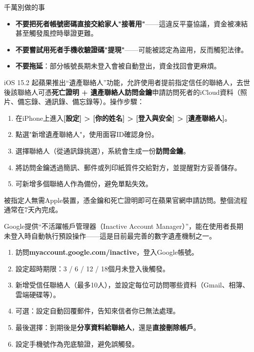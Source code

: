 \begin{tcbwarn}{千萬別做的事}
\begin{itemize}
  \item \textbf{不要把死者帳號密碼直接交給家人"接著用"}——這違反平臺協議，資金被凍結甚至觸發風控時舉證更難。
  \item \textbf{不要嘗試用死者手機收驗證碼"提現"}——可能被認定為盜用，反而觸犯法律。
  \item \textbf{不要拖延}：部分帳號長期未登入會被自動登出，資金找回會更麻煩。
\end{itemize}

\end{tcbwarn}


iOS 15.2 起蘋果推出“遺產聯絡人”功能，允許使用者提前指定信任的聯絡人，去世後該聯絡人可憑\textbf{死亡證明 + 遺產聯絡人訪問金鑰}申請訪問死者的iCloud資料（照片、備忘錄、通訊錄、備忘錄等）。操作步驟：

\begin{enumerate}
  \item 在iPhone上進入\textbf{[設定] > [你的姓名] > [登入與安全] > [遺產聯絡人]}。
  \item 點選"新增遺產聯絡人"，使用面容ID確認身份。
  \item 選擇聯絡人（從通訊錄挑選），系統會生成一份\textbf{訪問金鑰}。
  \item 將訪問金鑰透過簡訊、郵件或列印紙質件交給對方，並提醒對方妥善儲存。
  \item 可新增多個聯絡人作為備份，避免單點失效。
\end{enumerate}

被指定人無需Apple裝置，憑金鑰和死亡證明即可在蘋果官網申請訪問。整個流程通常在7天內完成。


Google提供“不活躍帳戶管理器（Inactive Account Manager）”，能在使用者長期未登入時自動執行預設操作——這是目前最完善的數字遺產機制之一。

\begin{enumerate}
  \item 訪問\textbf{myaccount.google.com/inactive}，登入Google帳號。
  \item 設定超時期限：3 / 6 / 12 / 18個月未登入後觸發。
  \item 新增受信任聯絡人（最多10人），並設定每位可訪問哪些資料（Gmail、相簿、雲端硬碟等）。
  \item 可選：設定自動回覆郵件，告知來信者你已無法處理。
  \item 最後選擇：到期後是\textbf{分享資料給聯絡人}，還是\textbf{直接刪除帳戶}。
  \item 設定手機號作為兜底驗證，避免誤觸發。
\end{enumerate}

